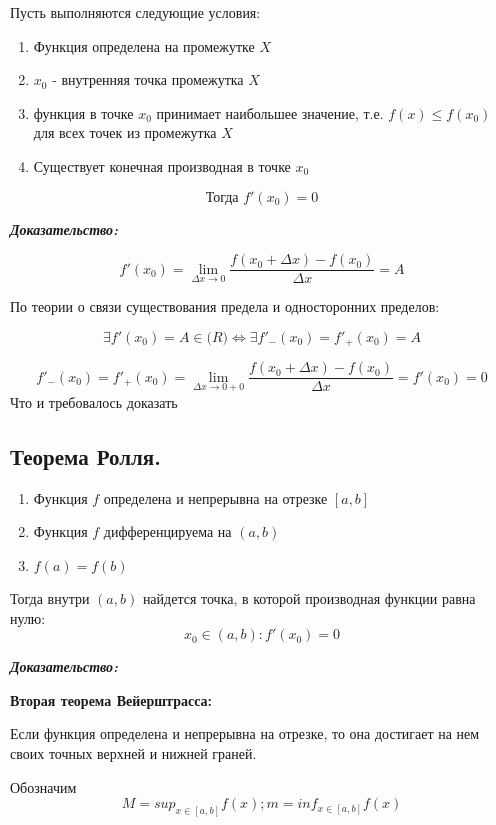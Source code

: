 \documentclass[a4paper,12pt]{article}
\theoremstyle{plain} %
\theoremstyle{definition} %
\theoremstyle{remark} %
\begin{document}
Пусть выполняются следующие условия:

\begin{enumerate}
	\item Функция определена на промежутке $X$
	\item $x_0$ - внутренняя точка промежутка $X$
	\item функция в точке $x_0$ принимает наибольшее значение, т.е. $f(x) \leq f(x_0)$ для всех точек из промежутка $X$
	\item Существует конечная производная в точке $x_0$
\end{enumerate}
\[ \textbf{Тогда } f'(x_0) = 0 \]

\textit{\textbf{Доказательство:}}

\[
	f'(x_0) = \lim_{\Delta x \rightarrow 0} \frac{f(x_0 + \Delta x) - f(x_0)}{\Delta x} = A
\]

По теории о связи существования предела и односторонних пределов:

\[
	\exists f'(x_0) = A \in \mathbf(R) \Leftrightarrow \exists f'_-(x_0) = f'_+(x_0) = A
\]

\[
	f'_-(x_0) = f'_+(x_0) = \lim_{\Delta x \rightarrow 0 + 0} \frac{f(x_0 + \Delta x) - f(x_0)}{\Delta x} = f'(x_0) = 0
\]
Что и требовалось доказать


\newpage
\subsection*{Теорема Ролля.                                                                             }

\begin{enumerate}
	\item Функция $f$ определена и непрерывна на отрезке $[a, b]$
	\item Функция $f$ дифференцируема на $(a, b)$
	\item $f(a) = f(b)$
\end{enumerate}

Тогда внутри $(a, b)$ найдется точка, в которой производная функции равна нулю:
\[
	x_0 \in (a, b): f'(x_0) = 0
\]

\textit{\textbf{Доказательство:}}

\textbf{Вторая теорема Вейерштрасса:}

Если функция определена и непрерывна на отрезке, то она достигает на нем своих точных верхней и нижней граней.

Обозначим
\[ M = sup_{x \in [a, b]}f(x); m = inf_{x \in [a, b]} f(x) \]
\end{document}
